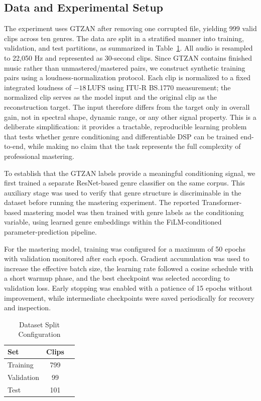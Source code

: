 \documentclass[journal]{IEEEtran}
\begin{document}
\subsection{Data and Experimental Setup}
The experiment uses GTZAN after removing one corrupted file, yielding 999 valid clips across ten genres. The data are split in a stratified manner into training, validation, and test partitions, as summarized in Table~\ref{tab:data_split}. All audio is resampled to 22,050 Hz and represented as 30-second clips. Since GTZAN contains finished music rather than unmastered/mastered pairs, we construct synthetic training pairs using a loudness-normalization protocol. Each clip is normalized to a fixed integrated loudness of $-18\,\mathrm{LUFS}$ using ITU-R BS.1770 measurement; the normalized clip serves as the model input and the original clip as the reconstruction target. The input therefore differs from the target only in overall gain, not in spectral shape, dynamic range, or any other signal property. This is a deliberate simplification: it provides a tractable, reproducible learning problem that tests whether genre conditioning and differentiable DSP can be trained end-to-end, while making no claim that the task represents the full complexity of professional mastering.

To establish that the GTZAN labels provide a meaningful conditioning signal, we first trained a separate ResNet-based genre classifier on the same corpus. This auxiliary stage was used to verify that genre structure is discriminable in the dataset before running the mastering experiment. The reported Transformer-based mastering model was then trained with genre labels as the conditioning variable, using learned genre embeddings within the FiLM-conditioned parameter-prediction pipeline.

For the mastering model, training was configured for a maximum of 50 epochs with validation monitored after each epoch. Gradient accumulation was used to increase the effective batch size, the learning rate followed a cosine schedule with a short warmup phase, and the best checkpoint was selected according to validation loss. Early stopping was enabled with a patience of 15 epochs without improvement, while intermediate checkpoints were saved periodically for recovery and inspection.

\begin{table}[htbp]
\caption{Dataset Split Configuration}
\label{tab:data_split}
\centering
\begin{tabular}{lcc}
\toprule
Set & Clips \\
\midrule
Training & 799  \\
Validation & 99  \\
Test & 101 &  \\
\bottomrule
\end{tabular}
\end{table}
\end{document}
